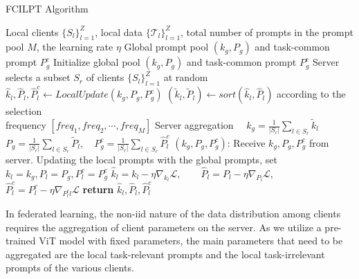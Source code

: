 \documentclass[sigconf,anonymous,review,screen]{acmart}
\begin{document}
\begin{algorithm}[t]
	\renewcommand{\algorithmicrequire}{\textbf{Input:}}
	\renewcommand{\algorithmicensure}{\textbf{Output:}}
	\caption{FCILPT Algorithm}
	\label{alg1}
	\begin{algorithmic}[1]
		\REQUIRE  Local clients $\{S_l\}_{l=1}^Z$, local data $\{\mathcal{T}_l\}_{l=1}^Z$, total number of prompts in the prompt pool $M$, the learning rate $\eta$
		\ENSURE Global prompt pool $(k_g, P_g)$ and task-common prompt $P_g^c$
		\renewcommand{\algorithmicrequire}{\textbf{Server executes:}}
		\REQUIRE
		\STATE Initialize global pool $(k_g, P_g)$ and task-common prompt $P_g^c$
		\STATE Server selects a subset $S_r$ of clients $\{S_l\}_{l=1}^Z$ at random
		\STATE $\hat{k}_l, \hat{P}_l, \hat{P}_l^c \leftarrow LocalUpdate (k_g, P_g, P_g^c) $
		\STATE $(\tilde{k}_l, \tilde{P}_l) \leftarrow sort (\hat{k}_l, \hat{P}_l)$ according to the selection \\ frequency $[freq_1,freq_2,\cdots,freq_M]$
		\ENDFOR		
		\STATE Server aggregation $\quad k_g = \frac{1}{\left| S_r \right|} \sum_{l \in S_r} \tilde{k}_l$ \\
		$P_g = \frac{1}{\left| S_r \right|} \sum_{l \in S_r} \tilde{P}_l, \quad P_g^c = \frac{1}{\left| S_r \right|} \sum_{l \in S_r} \hat{P}_l^c$
		\ENDFOR
		\renewcommand{\algorithmicensure}{\textbf{LocalUpdate}}
		\ENSURE $(k_g, P_g, P_g^c)$:
		\STATE Receive $k_g, P_g, P_g^c$ from server.
		\STATE Updating the local prompts with the global prompts, set \\ $k_l=k_g, P_l=P_g, P_l^c=P_g^c$
		\STATE $\hat{k}_l = k_l - \eta \nabla_{k_l} \mathcal{L}, \qquad \hat{P}_l = P_l - \eta \nabla_{P_l} \mathcal{L},$ \\ $\hat{P}_l^c = P_l^c - \eta \nabla_{P_l^cl} \mathcal{L}$
		\ENDFOR
		\ENDFOR
		\STATE \textbf{return} $\hat{k}_l, \hat{P}_l, \hat{P}_l^c$
	\end{algorithmic}
\end{algorithm}



In federated learning, the non-iid nature of the data distribution among clients requires the aggregation of client parameters on the server. As we utilize a pre-trained ViT model with fixed parameters, the main parameters that need to be aggregated are the local task-relevant prompts and the local task-irrelevant prompts of the various clients.
\end{document}
